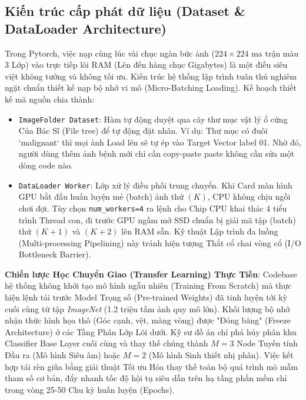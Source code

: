 \documentclass[conference,a4paper]{IEEEtran}
\begin{document}
\subsection{Kiến trúc cấp phát dữ liệu (Dataset \& DataLoader Architecture)}
Trong Pytorch, việc nạp cùng lúc vài chục ngàn bức ảnh ($224 \times 224$ ma trận màu 3 Lớp) vào trực tiếp lõi RAM (Lên đến hàng chục Gigabytes) là một điều siêu việt không tưởng và không tối ưu. Kiến trúc hệ thống lập trình tuân thủ nghiêm ngặt chuẩn thiết kế nạp bộ nhớ vi mô (Micro-Batching Loading). Kế hoạch thiết kế mã nguồn chia thành:
\begin{itemize}
\item \texttt{ImageFolder Dataset}: Hàm tự động duyệt qua cây thư mục vật lý ổ cứng Của Bác Sĩ (File tree) để tự động đặt nhãn. Ví dụ: Thư mục có đuôi `malignant` thì mọi ảnh Load lên sẽ tự ép vào Target Vector label 01. Nhờ đó, người dùng thêm ảnh bệnh mới chỉ cần copy-paste paste không cần sửa một dòng code nào.
\item \texttt{DataLoader Worker}: Lớp xử lý điều phối trung chuyển. Khi Card màn hình GPU bắt đầu huấn luyện mẻ (batch) ảnh thứ $(K)$, CPU không chịu ngồi chơi đợi. Tùy chọn \texttt{num\_workers=4} ra lệnh cho Chip CPU khai thác 4 tiểu trình Thread con, đi trước GPU ngầm mở SSD chuẩn bị giải mã tập (batch) thứ $(K+1)$ và $(K+2)$ lên RAM sẵn. Kỹ thuật Lập trình đa luồng (Multi-processing Pipelining) này tránh hiện tượng Thắt cổ chai vòng cổ (I/O Bottleneck Barrier).
\end{itemize}
\textbf{Chiến lược Học Chuyển Giao (Transfer Learning) Thực Tiễn}: Codebase hệ thống không khởi tạo mô hình ngẫu nhiên (Training From Scratch) mà thực hiện lệnh tải trước Model Trọng số (Pre-trained Weights) đã tinh luyện tới kỳ cuối cùng từ tập \textit{ImageNet} (1.2 triệu tấm ảnh quy mô lớn). Khối lượng bộ nhớ nhận thức hình họa thô (Góc cạnh, vệt, màng vòng) được "Đóng băng" (Freeze Architecture) ở các Tầng Phân Lớp Lõi dưới. Kỹ sư đồ án chỉ phá hủy phân khu Classifier Base Layer cuối cùng và thay thế chúng thành $M=3$ Node Tuyến tính Đầu ra (Mô hình Siêu âm) hoặc $M=2$ (Mô hình Sinh thiết nhị phân). Việc kết hợp tái rèn giũa bằng giải thuật Tối ưu Hóa thay thế toàn bộ quá trình mò mẫm tham số cơ bản, đẩy nhanh tốc độ hội tụ siêu dẫn trên hạ tầng phần mềm chỉ trong vòng 25-50 Chu kỳ huấn luyện (Epochs).
\end{document}

